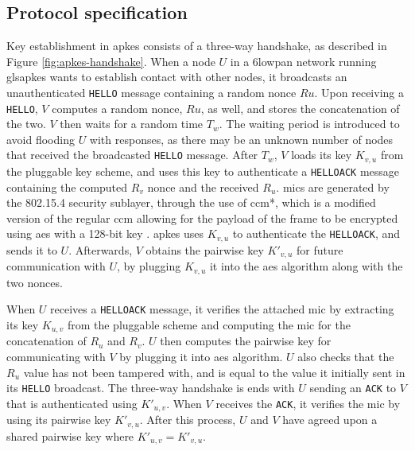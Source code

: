 

\subsection{Protocol specification}

Key establishment in \gls{apkes} consists of a three-way handshake, as described in Figure \ref{fig:apkes-handshake}. When a node $U$ in a \gls{6lowpan} network running gls{apkes} wants to establish contact with other nodes, it broadcasts an unauthenticated \texttt{HELLO} message containing a random nonce $Ru$. Upon receiving a \texttt{HELLO}, $V$ computes a random nonce, $Ru$, as well, and stores the concatenation of the two. $V$ then waits for a random time $T_w$. The waiting period is introduced to avoid flooding $U$ with responses, as there may be an unknown number of nodes that received the broadcasted \texttt{HELLO} message. After $T_w$, $V$ loads its key $K_{v,u}$ from the pluggable key scheme, and uses this key to authenticate a \texttt{HELLOACK} message containing the computed $R_v$ nonce and the received $R_u$. \gls{mic}s are generated by the 802.15.4 security sublayer, through the use of \gls{ccm}*, which is a modified version of the regular \gls{ccm} allowing for the payload of the frame to be encrypted using \gls{aes} with a 128-bit key \cite{krentz20136lowpan}. \gls{apkes} uses $K_{v,u}$ to authenticate the \texttt{HELLOACK}, and sends it to $U$. Afterwards, $V$ obtains the pairwise key $K'_{v,u}$ for future communication with $U$, by plugging $K_{v,u}$ it into the \gls{aes} algorithm along with the two nonces.


When $U$ receives a \texttt{HELLOACK} message, it verifies the attached \gls{mic} by extracting its key $K_{u,v}$ from the pluggable scheme and computing the \gls{mic} for the concatenation of $R_u$ and $R_v$. $U$ then computes the pairwise key for communicating with $V$ by plugging it into \gls{aes} algorithm. $U$ also checks that the $R_u$ value has not been tampered with, and is equal to the value it initially sent in its \texttt{HELLO} broadcast. The three-way handshake is ends with $U$ sending an \texttt{ACK} to $V$ that is authenticated using $K'_{u,v}$. When $V$ receives the \texttt{ACK}, it verifies the \gls{mic} by using its pairwise key $K'_{v,u}$. After this process, $U$ and $V$ have agreed upon a shared pairwise key where $K'_{u,v} = K'_{v,u}$.



